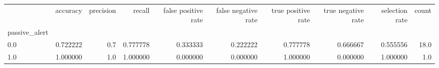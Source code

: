 \begin{tabular}{lrrrrrrrrr}
\toprule
{} &  accuracy &  precision &    recall &  false positive rate &  false negative rate &  true positive rate &  true negative rate &  selection rate &  count \\
passive\_alert &           &            &           &                      &                      &                     &                     &                 &        \\
\midrule
0.0           &  0.722222 &        0.7 &  0.777778 &             0.333333 &             0.222222 &            0.777778 &            0.666667 &        0.555556 &   18.0 \\
1.0           &  1.000000 &        1.0 &  1.000000 &             0.000000 &             0.000000 &            1.000000 &            0.000000 &        1.000000 &    1.0 \\
\bottomrule
\end{tabular}
